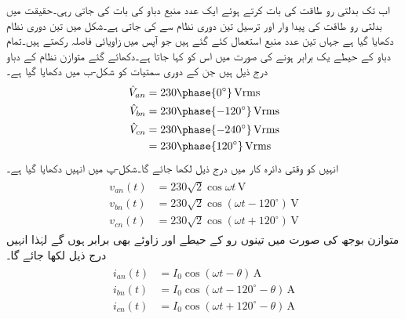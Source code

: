 اب تک بدلتی رو طاقت کی بات کرتے ہوئے  ایک عدد منبع دباو کی بات کی جاتی رہی۔حقیقت میں بدلتی رو طاقت کی پیدا وار اور ترسیل تین دوری نظام سے کی جاتی ہے۔شکل  میں تین دوری نظام دکھایا گیا ہے جہاں تین عدد منبع استعمال کئے گئے ہیں جو آپس میں  زاویائی فاصلہ رکھتے ہیں۔تمام دباو کے حیطے یک برابر ہونے کی صورت میں اس کو  کہا جاتا ہے۔دکھائے گئے متوازن نظام کے دباو درج ذیل ہیں جن کے دوری سمتیات کو شکل-ب میں دکھایا گیا ہے۔
\begin{gather}
\begin{aligned}
\hat{V}_{an}&=230 \phase{0^{\circ}}\,\si{\volt} \rms\\
\hat{V}_{bn}&=230 \phase{-120^{\circ}}\,\si{\volt} \rms\\
\hat{V}_{cn}&=230 \phase{-240^{\circ}}\,\si{\volt} \rms\\
&=230 \phase{120^{\circ}}\,\si{\volt} \rms
\end{aligned}
\end{gather}
انہیں کو وقتی دائرہ کار میں درج ذیل لکھا جائے گا۔شکل-پ میں انہیں دکھایا گیا ہے۔
\begin{gather}
\begin{aligned}\label{مساوات_تین_دوری_ستارہ_الف}
v_{an}(t)&=230\sqrt{2} \cos\omega t \,\si{\volt}\\
v_{bn}(t)&=230\sqrt{2} \cos(\omega t-120^{\circ})\,\si{\volt}\\
v_{cn}(t)&=230\sqrt{2} \cos(\omega t +120^{\circ})\,\si{\volt}
\end{aligned}
\end{gather}
متوازن بوجھ کی صورت میں تینوں رو کے حیطے اور زاوئے بھی برابر ہوں گے لہٰذا انہیں درج ذیل لکھا جائے گا۔
\begin{gather}
\begin{aligned}
i_{an}(t)&=I_0 \cos(\omega t -\theta)\,\si{\ampere}\\
i_{bn}(t)&=I_0 \cos(\omega t-120^{\circ}-\theta)\,\si{\ampere}\\
i_{cn}(t)&=I_0 \cos(\omega t +120^{\circ}-\theta)\,\si{\ampere}
\end{aligned}
\end{gather}
%
